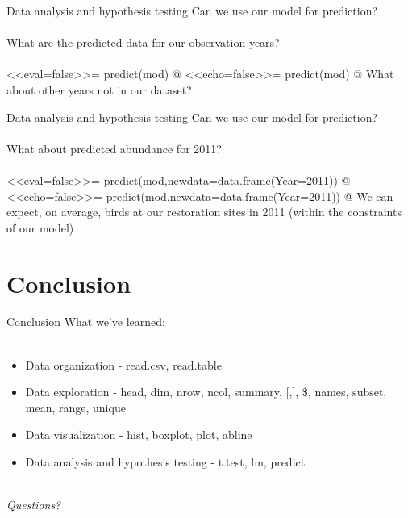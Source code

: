 \documentclass[xcolor=svgnames]{beamer}
\begin{document}
\begin{frame}[fragile]{Data analysis and hypothesis testing}
Can we use our model for prediction?\\~\\
What are the predicted data for our observation years?\\~\\
<<eval=false>>=
predict(mod)
@
\scriptsize
\pause
<<echo=false>>=
predict(mod)
@
\vspace{0.2in}
\normalsize
\pause
What about other years not in our dataset?
\end{frame}

\begin{frame}[fragile]{Data analysis and hypothesis testing}
Can we use our model for prediction?\\~\\
What about predicted abundance for 2011?\\~\\
<<eval=false>>=
predict(mod,newdata=data.frame(Year=2011))
@
\pause
<<echo=false>>=
predict(mod,newdata=data.frame(Year=2011))
@
\vspace{0.2in}
We can expect, on average,  birds at our restoration sites in 2011 (within the constraints of our model)
\end{frame}

\section{Conclusion}

\begin{frame}{Conclusion}
What we've learned:\\~\\
\begin{itemize}
\itemsep20pt
\item Data organization - read.csv, read.table
\item Data exploration - head, dim, nrow, ncol, summary, [,], \$, names, subset, mean, range, unique
\item Data visualization - hist, boxplot, plot, abline
\item Data analysis and hypothesis testing - t.test, lm, predict\\~\\
\end{itemize}
\LARGE
\centerline{\emph{Questions?}}
\end{frame}
\end{document}
